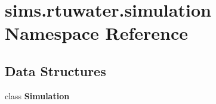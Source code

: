 \section{sims.\+rtuwater.\+simulation Namespace Reference}
\label{namespacesims_1_1rtuwater_1_1simulation}
\subsection*{Data Structures}
\begin{DoxyCompactItemize}
\item 
class {\bf Simulation}
\end{DoxyCompactItemize}
